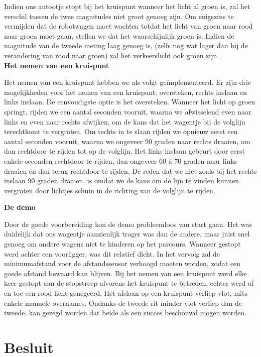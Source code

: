 \documentclass[a4paper,kulak]{kulakarticle}
\begin{document}
Indien ons autootje stopt bij het kruispunt wanneer het licht al groen is, zal het verschil tussen de twee magnitudes niet groot genoeg zijn. Om enigszins te vermijden dat de robotwagen moet wachten totdat het licht van groen naar rood naar groen moet gaan, stellen we dat het waarschijnlijk groen is. Indien de magnitude van de tweede meting laag genoeg is, (zelfs nog wat lager dan bij de verandering van rood naar groen) zal het verkeerslicht ook groen zijn.\\

\textbf{\large Het nemen van een kruispunt} \

Het nemen van een kruispunt hebben we als volgt geïmplementeerd. Er zijn drie mogelijkheden voor het nemen van een kruispunt: oversteken, rechts inslaan en links inslaan. De eenvoudigste optie is het oversteken. Wanneer het licht op groen springt, rijden we een aantal seconden vooruit, waarna we afwisselend even naar links en even naar rechts afwijken, om de kans dat het wagentje bij de volglijn terechtkomt te vergroten. Om rechts in te slaan rijden we opnieuw eerst een aantal seconden vooruit, waarna we ongeveer 90 graden naar rechts draaien, om dan rechtdoor te rijden tot op de volglijn. Het links inslaan gebeurt door eerst enkele seconden rechtdoor te rijden, dan ongeveer 60 à 70 graden naar links draaien en dan terug rechtdoor te rijden. De reden dat we niet zoals bij het rechts inslaan 90 graden draaien, is omdat we de kans om de lijn te vinden kunnen vergroten door lichtjes schuin in de richting van de volglijn te rijden. 

\textbf{\large De demo} \

Door de goede voorbereiding kon de demo probleemloos van start gaan. Het was duidelijk dat ons wagentje aanzienlijk trager was dan de andere, maar juist snel genoeg om andere wagens niet te hinderen op het parcours. Wanneer gestopt werd achter een voorligger, was dit relatief dicht. In het vervolg zal de minimumafstand voor de afstandssensor verhoogd moeten worden, zodat een goede afstand bewaard kan blijven. Bij het nemen van een kruispunt werd elke keer gestopt aan de stopstreep alvorens het kruispunt te betreden, echter werd af en toe een rood licht genegeerd. Het afslaan op een kruispunt verliep vlot, mits enkele manuele overnames. Ondanks de tweede rit minder vlot verliep dan de tweede, kan gezegd worden dat beide als een succes beschouwd mogen worden.  
\section{Besluit}
\end{document}
